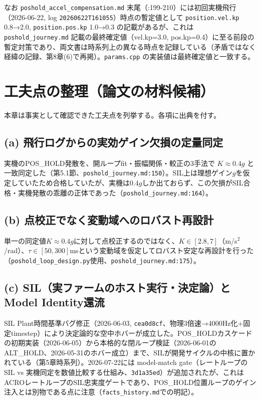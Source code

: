 \documentclass[a4paper,10pt]{ltjsarticle}
\begin{document}
なお \texttt{poshold\_accel\_compensation.md} 末尾（:199-210）には初回実機飛行（2026-06-22, log \texttt{20260622T161055}）時点の暫定値として \texttt{position.vel.kp} 0.8→2.0, \texttt{position.pos.kp} 1.0→0.3 の記載があるが、これは \texttt{poshold\_journey.md} 記載の最終確定値（vel.kp=3.0, pos.kp=0.4）に至る前段の暫定対策であり、両文書は時系列上の異なる時点を記録している（矛盾ではなく経緯の記録、第8章(6)で再掲）。\texttt{params.cpp} の実装値は最終確定値と一致する。

\section{工夫点の整理（論文の材料候補）}

本章は事実として確認できた工夫点を列挙する。各項に出典を付す。

\subsection{(a) 飛行ログからの実効ゲイン欠損の定量同定}

実機のPOS\_HOLD発散を、開ループfit・振幅関係・較正の3手法で $K \approx 0.4g$ と一致同定した（第5.1節、\texttt{poshold\_journey.md:150}）。SIL上は理想ゲイン$g$を仮定していたため合格していたが、実機は$0.4g$しか出ておらず、この欠損がSIL合格・実機発散の乖離の正体であった（\texttt{poshold\_journey.md:164}）。

\subsection{(b) 点校正でなく変動域へのロバスト再設計}

単一の同定値$K\approx0.4g$に対して点校正するのではなく、$K\in[2.8,7]$（m/s$^2$/rad）、$\tau\in[50,300]$msという変動域を仮定してロバスト安定な再設計を行った（\texttt{poshold\_loop\_design.py}使用、\texttt{poshold\_journey.md:175}）。

\subsection{(c) SIL（実ファームのホスト実行・決定論）とModel Identity還流}

SIL Plant時間基準バグ修正（2026-06-03, \texttt{cea0d8cf}、物理3倍速→4000Hz化+固定timestep）により決定論的な空中ホバーが成立した。POS\_HOLDカスケードの初期実装（2026-06-05）から本格的な閉ループ検証（2026-06-01のALT\_HOLD、2026-05-31のホバー成立）まで、SILが開発サイクルの中核に置かれている（第5章時系列）。2026-07-22には model-match gate（レートループのSIL vs 実機同定を数値比較する仕組み、\texttt{3d1a35ed}）が追加されたが、これはACROレートループのSIL忠実度ゲートであり、POS\_HOLD位置ループのゲイン注入とは別物である点に注意（\texttt{facts\_history.md}での明記）。
\end{document}
